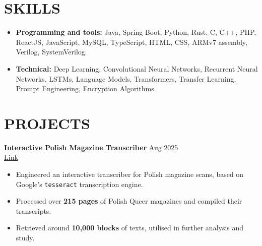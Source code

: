\documentclass[a4paper,1.5pt]{extarticle}
\begin{document}

\section*{SKILLS}
\begin{itemize}
    \item \textbf{Programming and tools:} Java, Spring Boot, Python, Rust, C, C++, PHP, ReactJS, JavaScript, MySQL, TypeScript, HTML, CSS, ARMv7 assembly, Verilog, SystemVerilog.
    \item \textbf{Technical:} Deep Learning, Convolutional Neural Networks, Recurrent Neural Networks, LSTMs, Language Models, Transformers, Transfer Learning, Prompt Engineering, Encryption Algorithms. 
\end{itemize}

\section*{PROJECTS}
\noindent
\textbf{Interactive Polish Magazine Transcriber} \hfill Aug 2025 \\ %
\href{https://github.com/manojmanikandan7/PolishMagTextRecog}{Link}  %
\begin{itemize}
    \item Engineered an interactive transcriber for Polish magazine scans, based on Google's \texttt{tesseract} transcription engine.
    \item Processed over \textbf{215 pages} of Polish Queer magazines and compiled their transcripts.
    \item Retrieved around \textbf{10,000 blocks} of texts, utilised in further analysis and study.
\end{itemize}
\end{document}
